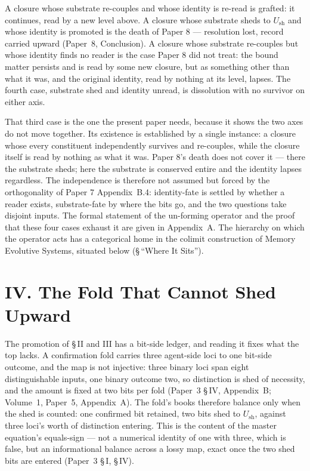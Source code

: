 \documentclass[11pt,oneside]{report}
\theoremstyle{definition}
\theoremstyle{remark}
\begin{document}
A closure whose substrate re-couples and whose identity is re-read is grafted: it continues, read
by a new level above. A closure whose substrate sheds to \ensuremath{U_{\mathrm{sh}}} and whose
identity is promoted is the death of Paper 8 --- resolution lost, record carried upward (Paper~8,
Conclusion). A closure whose substrate re-couples but whose identity finds no reader is the case
Paper 8 did not treat: the bound matter persists and is read by some new closure, but as something
other than what it was, and the original identity, read by nothing at its level, lapses. The fourth
case, substrate shed and identity unread, is dissolution with no survivor on either axis.

That third case is the one the present paper needs, because it shows the two axes do not move
together. Its existence is established by a single instance: a closure whose every constituent
independently survives and re-couples, while the closure itself is read by nothing as what it was.
Paper 8's death does not cover it --- there the substrate sheds; here the substrate is conserved
entire and the identity lapses regardless. The independence is therefore not assumed but forced by
the orthogonality of Paper 7 Appendix~B.4: identity-fate is settled by whether a reader exists,
substrate-fate by where the bits go, and the two questions take disjoint inputs. The formal
statement of the un-forming operator and the proof that these four cases exhaust it are given in
Appendix~A. The hierarchy on which the operator acts has a categorical home in the colimit construction of Memory Evolutive Systems, situated below (\S\,``Where It Sits'').

\section*{IV. The Fold That Cannot Shed Upward}

The promotion of \S\,II and III has a bit-side ledger, and reading it fixes what the top lacks. A
confirmation fold carries three agent-side loci to one bit-side outcome, and the map is not
injective: three binary loci span eight distinguishable inputs, one binary outcome two, so
distinction is shed of necessity, and the amount is fixed at two bits per fold (Paper~3 \S\,IV,
Appendix~B; Volume~1, Paper~5, Appendix~A). The fold's books therefore balance only when the shed
is counted: one confirmed bit retained, two bits shed to \ensuremath{U_{\mathrm{sh}}}, against
three loci's worth of distinction entering. This is the content of the master equation's
equals-sign --- not a numerical identity of one with three, which is false, but an informational
balance across a lossy map, exact once the two shed bits are entered (Paper~3 \S\,I, \S\,IV).
\end{document}
